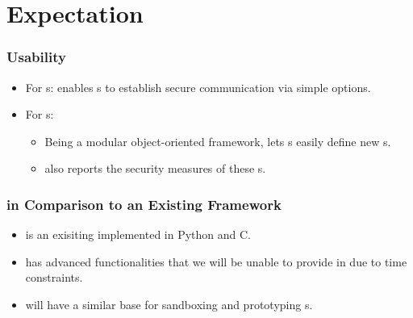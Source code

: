 
\section{Expectation}
\frame{\sectionpage}


\begin{frame} %
\frametitle{Usability}
\begin{itemize}
\item For \eu s: \cry{} enables \eu s to establish
  secure communication via simple \cl{} options.
\item For \cg s:
  \begin{itemize}
  \item Being a modular object-oriented framework,
    \cry{} lets \cg s easily define new \cs s.
  \item \cry{} also reports the security measures
    of these \cs s.
  \end{itemize}
\end{itemize}
\end{frame}

\begin{frame}
\frametitle{in Comparison to an Existing Framework}
\begin{itemize}
\item \charm{} is an exisiting \cf{}
  implemented in Python and C.
\item \charm{} has advanced functionalities
  that we will be unable to provide in \cry{}
  due to time constraints.
\item \cry{} will have a similar base for sandboxing
  and prototyping \cs s.
\end{itemize}
\end{frame}

